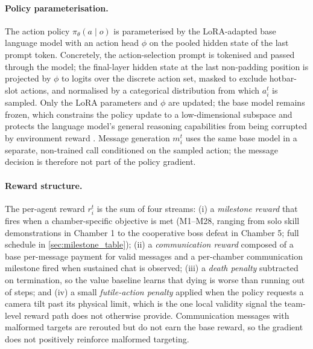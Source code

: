\paragraph{Policy parameterisation.}
The action policy $\pi_\theta(a \mid o)$ is parameterised by the LoRA-adapted base language model with an action head $\phi$ on the pooled hidden state of the last prompt token. Concretely, the action-selection prompt is tokenised and passed through the model; the final-layer hidden state at the last non-padding position is projected by $\phi$ to logits over the discrete action set, masked to exclude hotbar-slot actions, and normalised by a categorical distribution from which $a_i^t$ is sampled. Only the LoRA parameters and $\phi$ are updated; the base model remains frozen, which constrains the policy update to a low-dimensional subspace and protects the language model's general reasoning capabilities from being corrupted by environment reward \cite{hu2022lora, qian2025toolrl}. Message generation $m_i^t$ uses the same base model in a separate, non-trained call conditioned on the sampled action; the message decision is therefore not part of the policy gradient.

\paragraph{Reward structure.}
The per-agent reward $r_i^t$ is the sum of four streams: (i) a \emph{milestone reward} that fires when a chamber-specific objective is met (M1--M28, ranging from solo skill demonstrations in Chamber 1 to the cooperative boss defeat in Chamber 5; full schedule in \autoref{sec:milestone_table}); (ii) a \emph{communication reward} composed of a base per-message payment for valid messages and a per-chamber communication milestone fired when sustained chat is observed; (iii) a \emph{death penalty} subtracted on termination, so the value baseline learns that dying is worse than running out of steps; and (iv) a small \emph{futile-action penalty} applied when the policy requests a camera tilt past its physical limit, which is the one local validity signal the team-level reward path does not otherwise provide. Communication messages with malformed targets are rerouted but do not earn the base reward, so the gradient does not positively reinforce malformed targeting.

